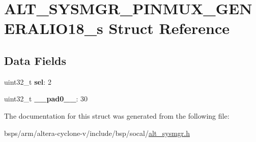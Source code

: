 \hypertarget{structALT__SYSMGR__PINMUX__GENERALIO18__s}{}\section{A\+L\+T\+\_\+\+S\+Y\+S\+M\+G\+R\+\_\+\+P\+I\+N\+M\+U\+X\+\_\+\+G\+E\+N\+E\+R\+A\+L\+I\+O18\+\_\+s Struct Reference}
\label{structALT__SYSMGR__PINMUX__GENERALIO18__s}
\subsection*{Data Fields}
\begin{DoxyCompactItemize}
\item 
\mbox{\label{structALT__SYSMGR__PINMUX__GENERALIO18__s_aec1a6f1d2cc5a9b919bdb00244796474}} 
uint32\+\_\+t {\bfseries sel}\+: 2
\item 
\mbox{\label{structALT__SYSMGR__PINMUX__GENERALIO18__s_a8b38090028ac2178458f4bfb0241468d}} 
uint32\+\_\+t {\bfseries \+\_\+\+\_\+pad0\+\_\+\+\_\+}\+: 30
\end{DoxyCompactItemize}


The documentation for this struct was generated from the following file\+:\begin{DoxyCompactItemize}
\item 
bsps/arm/altera-\/cyclone-\/v/include/bsp/socal/\mbox{\hyperlink{alt__sysmgr_8h}{alt\+\_\+sysmgr.\+h}}\end{DoxyCompactItemize}
